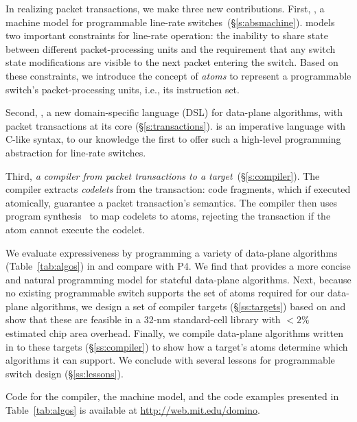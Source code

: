 In realizing packet transactions, we make three new contributions.  First, {\em
\absmachine}, a machine model for programmable line-rate
switches~(\S\ref{s:absmachine}).  \absmachine models two important constraints
for line-rate operation: the inability to share state between different
packet-processing units and the requirement that any switch state
modifications are visible to the next packet entering the switch. Based on
these constraints, we introduce the concept of {\em atoms} to represent a
programmable switch's packet-processing units, i.e., its instruction set.

Second, {\em \pktlanguage{}}, a new domain-specific language (DSL) for
data-plane algorithms, with packet transactions at its core
(\S\ref{s:transactions}).  \pktlanguage is an imperative language with C-like
syntax, to our knowledge the first to offer such a high-level programming
abstraction for line-rate switches.

Third, {\em a compiler from \pktlanguage packet transactions to a \absmachine
target}~(\S\ref{s:compiler}). The \pktlanguage compiler extracts {\em codelets}
from the transaction: code fragments, which if executed atomically, guarantee a
packet transaction's semantics. The compiler then uses program
synthesis~\cite{sketch_asplos} to map codelets to atoms, rejecting the
transaction if the atom cannot execute the codelet.


We evaluate expressiveness by programming a variety of data-plane algorithms
(Table~\ref{tab:algos}) in \pktlanguage and compare with P4. We find that
\pktlanguage provides a more concise and natural programming model for stateful
data-plane algorithms.  Next, because no existing programmable switch supports
the set of atoms required for our data-plane algorithms, we design a set of
compiler targets (\S\ref{ss:targets}) based on \absmachine and show that these
are feasible in a 32-nm standard-cell library with $< 2\%$ estimated chip area
overhead. Finally, we compile data-plane algorithms written in \pktlanguage to
these targets (\S\ref{ss:compiler}) to show how a target's atoms determine
which algorithms it can support. We conclude with several lessons for
programmable switch design (\S\ref{ss:lessons}).

Code for the \pktlanguage compiler, the \absmachine machine model, and the code
examples presented in Table~\ref{tab:algos} is available at
\url{http://web.mit.edu/domino}.

